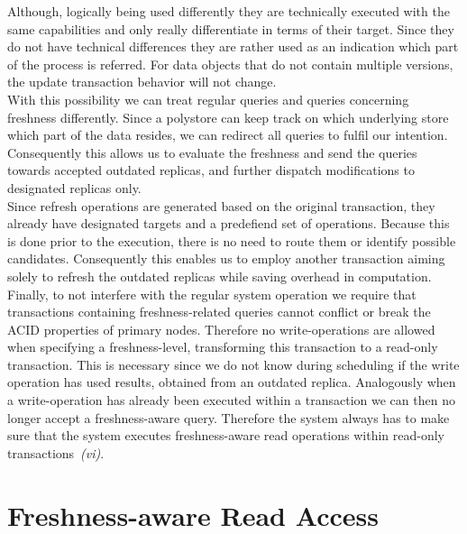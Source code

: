 Although, logically being used differently they are technically executed with the same capabilities and only really differentiate in terms of their target.
Since they do not have technical differences they are rather used as an indication which part of the process is referred.
For data objects that do not contain multiple versions, the update transaction behavior will not change.\\
With this possibility we can treat regular queries and queries concerning freshness differently. Since a polystore can keep track on which 
underlying store which part of the data resides, we can redirect all queries to fulfil our intention. Consequently this allows us to evaluate the freshness
and send the queries towards accepted outdated replicas, and further dispatch modifications to designated replicas only.\\
Since refresh operations are generated based on the original transaction, they already have designated targets and a predefiend set of operations.
Because this is done prior to the execution, there is no need to route them or identify possible candidates.
Consequently this enables us to employ another transaction aiming solely to refresh the outdated replicas while saving overhead in computation.\\
Finally, to not interfere with the regular system operation we require that transactions containing freshness-related queries cannot conflict or break the ACID properties 
of primary nodes. Therefore no write-operations are allowed when specifying a freshness-level, transforming this transaction to a read-only transaction.
This is necessary since we do not know during scheduling if the write operation has used results, obtained from an outdated replica.
Analogously when a write-operation has already been executed within a transaction we can then no longer accept a freshness-aware query. 
Therefore the system always has to make sure that the system executes freshness-aware read operations within read-only transactions~\textit{(vi)}. 






\section{Freshness-aware Read Access}
\label{sec:read_access}

